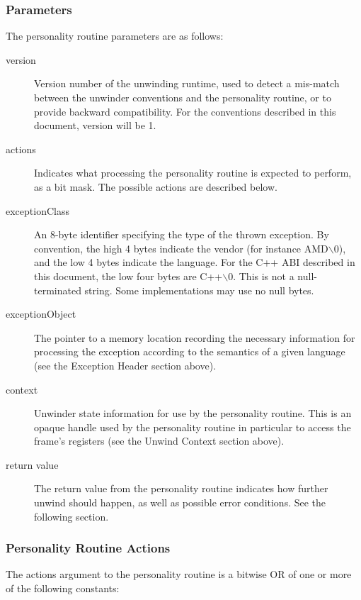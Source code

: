 \subsubsection{Parameters}

The personality routine parameters are as follows: 

\begin{description}
\item[version] Version number of the unwinding runtime, 
   used to detect a mis-match between the unwinder conventions and the 
   personality routine, or to provide backward compatibility. For the 
   conventions described in this document, version will be 1. 
\item[actions] Indicates what processing the personality routine 
   is expected to perform, as a bit mask. The possible actions are 
   described below. 
\item[exceptionClass] An 8-byte identifier specifying the type of the 
   thrown exception. By convention, the high 4 bytes indicate the vendor 
   (for instance AMD$\backslash$0), and the low 4 bytes indicate 
   the language.  For the C++ ABI described in this document, the low 
   four bytes are C++$\backslash$0.  This is not a null-terminated string. 
   Some implementations may use no null bytes. 
\item[exceptionObject] The pointer to a memory location recording the 
   necessary information for processing the exception according to the 
   semantics of a given language (see the Exception Header section above). 
\item[context] Unwinder state information for use by the personality routine. 
   This is an opaque handle used by the personality routine in particular
   to access the frame's registers (see the Unwind Context section above). 
\item[return value] The return value from the personality routine indicates 
   how further unwind should happen, as well as possible error conditions. 
   See the following section. 
\end{description}

\subsubsection{Personality Routine Actions}

The actions argument to the personality routine is a bitwise OR of one or 
more of the following constants: \\

